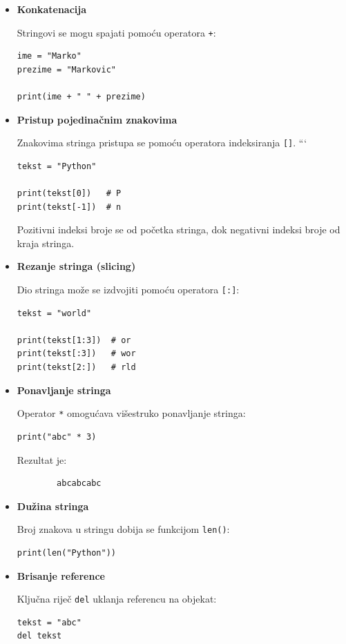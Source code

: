 \begin{itemize}
	
	\item \textbf{Konkatenacija}
	
	Stringovi se mogu spajati pomoću operatora \texttt{+}:
	
	\begin{verbatim}
ime = "Marko"
prezime = "Markovic"

print(ime + " " + prezime)
\end{verbatim}
	

	\item \textbf{Pristup pojedinačnim znakovima}
	
	Znakovima stringa pristupa se pomoću operatora indeksiranja \texttt{[]}.
	```
	
	\begin{verbatim}
tekst = "Python"

print(tekst[0])   # P
print(tekst[-1])  # n
\end{verbatim}
	
	Pozitivni indeksi broje se od početka stringa, dok negativni indeksi broje od kraja stringa.
	
	\item \textbf{Rezanje stringa (slicing)}
	
	Dio stringa može se izdvojiti pomoću operatora \texttt{[:]}:
	
	\begin{verbatim}
tekst = "world"

print(tekst[1:3])  # or
print(tekst[:3])   # wor
print(tekst[2:])   # rld
\end{verbatim}
	
	\item \textbf{Ponavljanje stringa}
	
	Operator \texttt{*} omogućava višestruko ponavljanje stringa:
	
	\begin{verbatim}
print("abc" * 3)
\end{verbatim}
	
	Rezultat je:
	
	\begin{verbatim}
		abcabcabc
	\end{verbatim}
	\item \textbf{Dužina stringa}
	
	Broj znakova u stringu dobija se funkcijom \texttt{len()}:
	
	\begin{verbatim}
print(len("Python"))
\end{verbatim}
	
	\item \textbf{Brisanje reference}
	
	Ključna riječ \texttt{del} uklanja referencu na objekat:
	
	\begin{verbatim}
tekst = "abc"
del tekst
\end{verbatim}
	
\end{itemize}

